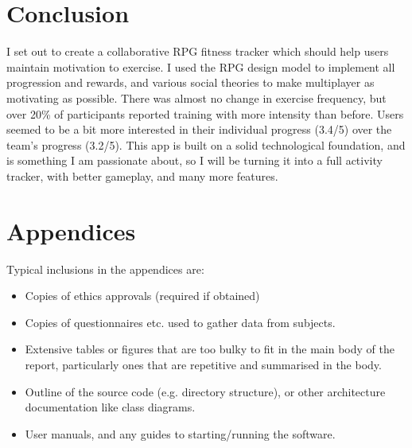 \documentclass{l4proj}
\begin{document}
\chapter{Conclusion}    
I set out to create a collaborative RPG fitness tracker which should help users maintain motivation to exercise. I used the RPG design model to implement all progression and rewards, and various social theories to make multiplayer as motivating as possible. There was almost no change in exercise frequency, but over 20\% of participants reported training with more intensity than before. Users seemed to be a bit more interested in their individual progress (3.4/5) over the team's progress (3.2/5). This app is built on a solid technological foundation, and is something I am passionate about, so I will be turning it into a full activity tracker, with better gameplay, and many more features.







\chapter{Appendices}

Typical inclusions in the appendices are:

\begin{itemize}
\item
  Copies of ethics approvals (required if obtained)
\item
  Copies of questionnaires etc. used to gather data from subjects.
\item
  Extensive tables or figures that are too bulky to fit in the main body of
  the report, particularly ones that are repetitive and summarised in the body.

\item Outline of the source code (e.g. directory structure), or other architecture documentation like class diagrams.

\item User manuals, and any guides to starting/running the software.

\end{itemize}
\end{document}
